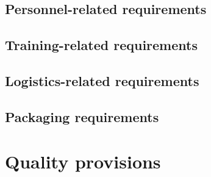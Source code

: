 \documentclass[a4paper, oneside, 11pt]{article}
\begin{document}
\subsection{Personnel-related requirements}

\subsection{Training-related requirements}

\subsection{Logistics-related requirements}

\subsection{Packaging requirements}

%
\section{Quality provisions}

%
%

%
%
\end{document}
